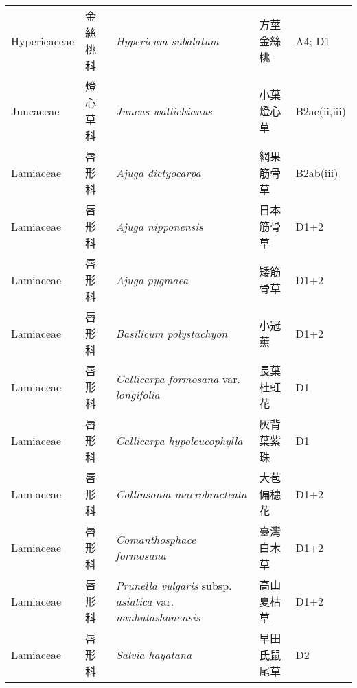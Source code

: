{\begin{longtable}{p{2.5cm}p{2.5cm}p{4.5cm}p{2.5cm}p{3cm}}
    Hypericaceae & 金絲桃科 & \textit{Hypericum subalatum}  & 方莖金絲桃 & A4; D1 \index{Hypericum@\textit{Hypericum}!subalatum@\textit{subalatum}}  \index{方莖金絲桃} \\
    Juncaceae & 燈心草科 & \textit{Juncus wallichianus}  & 小葉燈心草 & B2ac(ii,iii) \index{Juncus@\textit{Juncus}!wallichianus@\textit{wallichianus}}  \index{小葉燈心草} \\
    Lamiaceae & 唇形科 & \textit{Ajuga dictyocarpa}  & 網果筋骨草 & B2ab(iii) \index{Ajuga@\textit{Ajuga}!dictyocarpa@\textit{dictyocarpa}}  \index{網果筋骨草} \\
    Lamiaceae & 唇形科 & \textit{Ajuga nipponensis}  & 日本筋骨草 & D1+2 \index{Ajuga@\textit{Ajuga}!nipponensis@\textit{nipponensis}}  \index{日本筋骨草} \\
    Lamiaceae & 唇形科 & \textit{Ajuga pygmaea}  & 矮筋骨草 & D1+2 \index{Ajuga@\textit{Ajuga}!pygmaea@\textit{pygmaea}}  \index{矮筋骨草} \\
    Lamiaceae & 唇形科 & \textit{Basilicum polystachyon}  & 小冠薰 & D1+2 \index{Basilicum@\textit{Basilicum}!polystachyon@\textit{polystachyon}}  \index{小冠薰} \\
    Lamiaceae & 唇形科 & \textit{Callicarpa formosana} var. \textit{longifolia}  & 長葉杜虹花 & D1 \index{Callicarpa@\textit{Callicarpa}!formosana@\textit{formosana}!var. longifolia@var. \textit{longifolia}}  \index{長葉杜虹花} \\
    Lamiaceae & 唇形科 & \textit{Callicarpa hypoleucophylla}  & 灰背葉紫珠 & D1 \index{Callicarpa@\textit{Callicarpa}!hypoleucophylla@\textit{hypoleucophylla}}  \index{灰背葉紫珠} \\
    Lamiaceae & 唇形科 & \textit{Collinsonia macrobracteata}  & 大苞偏穗花 & D1+2 \index{Collinsonia@\textit{Collinsonia}!macrobracteata@\textit{macrobracteata}}  \index{大苞偏穗花} \\
    Lamiaceae & 唇形科 & \textit{Comanthosphace formosana}  & 臺灣白木草 & D1+2 \index{Comanthosphace@\textit{Comanthosphace}!formosana@\textit{formosana}}  \index{臺灣白木草} \\
    Lamiaceae & 唇形科 & \textit{Prunella vulgaris} subsp. \textit{asiatica} var. \textit{nanhutashanensis}  & 高山夏枯草 & D1+2 \index{Prunella@\textit{Prunella}!vulgaris@\textit{vulgaris}!subsp. asiatica@subsp. \textit{asiatica}!var. nanhutashanensis@var. \textit{nanhutashanensis}}  \index{高山夏枯草} \\
    Lamiaceae & 唇形科 & \textit{Salvia hayatana}  & 早田氏鼠尾草 & D2　 \index{Salvia@\textit{Salvia}!hayatana@\textit{hayatana}}  \index{早田氏鼠尾草} \\

\end{longtable}}
